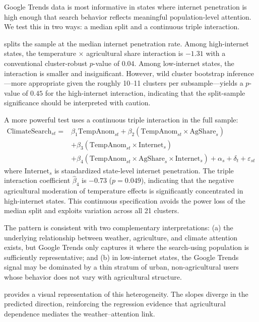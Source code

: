 \documentclass[12pt]{article}
\begin{document}
Google Trends data is most informative in states where internet penetration is high enough that search behavior reflects meaningful population-level attention. We test this in two ways: a median split and a continuous triple interaction.

 splits the sample at the median internet penetration rate. Among high-internet states, the temperature $\times$ agricultural share interaction is $-1.31$ with a conventional cluster-robust $p$-value of $0.04$. Among low-internet states, the interaction is smaller and insignificant. However, wild cluster bootstrap inference---more appropriate given the roughly 10--11 clusters per subsample---yields a $p$-value of $0.45$ for the high-internet interaction, indicating that the split-sample significance should be interpreted with caution.

A more powerful test uses a continuous triple interaction in the full sample:
\begin{align}
\label{eq:triple}
\text{ClimateSearch}_{st} = {} & \beta_1 \text{TempAnom}_{st} + \beta_2 (\text{TempAnom}_{st} \times \text{AgShare}_s) \nonumber \\
& + \beta_3 (\text{TempAnom}_{st} \times \text{Internet}_s) \nonumber \\
& + \beta_4 (\text{TempAnom}_{st} \times \text{AgShare}_s \times \text{Internet}_s) + \alpha_s + \delta_t + \varepsilon_{st}
\end{align}
where $\text{Internet}_s$ is standardized state-level internet penetration. The triple interaction coefficient $\hat{\beta}_4$ is $-0.73$ ($p = 0.049$), indicating that the negative agricultural moderation of temperature effects is significantly concentrated in high-internet states. This continuous specification avoids the power loss of the median split and exploits variation across all 21 clusters.



The pattern is consistent with two complementary interpretations: (a) the underlying relationship between weather, agriculture, and climate attention exists, but Google Trends only captures it where the search-using population is sufficiently representative; and (b) in low-internet states, the Google Trends signal may be dominated by a thin stratum of urban, non-agricultural users whose behavior does not vary with agricultural structure.

 provides a visual representation of this heterogeneity. The slopes diverge in the predicted direction, reinforcing the regression evidence that agricultural dependence mediates the weather--attention link.
\end{document}
